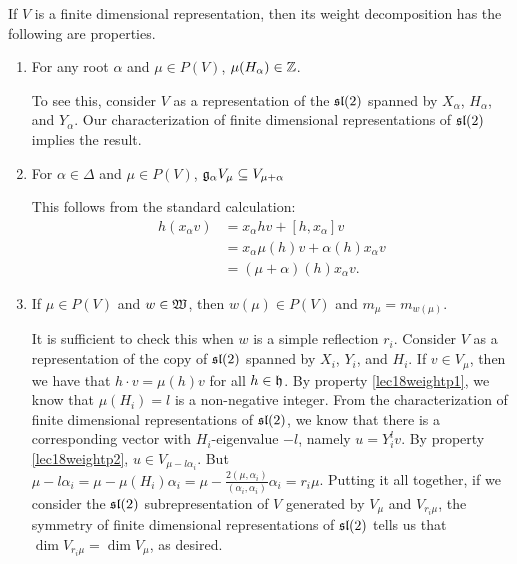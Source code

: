  If $V$ is a finite dimensional representation, then its weight decomposition has the
 following are properties.
 \begin{enumerate}
  \item \label{lec18weightp1} For any root $\alpha$ and $\mu\in P(V)$, $\mu(H_\alpha)\in \ZZ$.

    To see this, consider $V$ as a representation of the $\sl(2)$ spanned by
    $X_\alpha$, $H_\alpha$, and $Y_\alpha$. Our characterization of finite dimensional
    representations of $\sl(2)$ implies the result.

 \item \label{lec18weightp2} For $\alpha\in \Delta$ and $\mu\in P(V)$,  $\g_\alpha V_\mu\subseteq V_{\mu+\alpha}$

    This follows from the standard calculation:
    \begin{align*}
      h(x_\alpha v) &= x_\alpha hv + [h,x_\alpha]v\\
            &= x_\alpha \mu(h)v + \alpha(h) x_\alpha v\\
            &= (\mu+\alpha)(h)x_\alpha v.
    \end{align*}

   \item \label{lec18weightp3} If $\mu\in P(V)$ and $w\in \weyl$, then $w(\mu)\in P(V)$ and
   $m_\mu=m_{w(\mu)}$.

    It is sufficient to check this when $w$ is a simple reflection $r_i$. Consider $V$
    as a representation of the copy of $\sl(2)$ spanned by $X_i$, $Y_i$, and $H_i$. If
    $v\in V_\mu$, then we have that $h\cdot v = \mu(h) v$ for all $h\in \h$. By
    property \ref{lec18weightp1}, we know that $\mu(H_i)=l$ is a non-negative integer.
    From the characterization of finite dimensional representations of $\sl(2)$, we
    know that there is a corresponding vector with $H_i$-eigenvalue $-l$, namely $u =
    Y_i^l v$. By property \ref{lec18weightp2}, $u\in V_{\mu-l\alpha_i}$. But
    $\mu-l\alpha_i = \mu-\mu(H_i)\alpha_i = \mu -
    \frac{2(\mu,\alpha_i)}{(\alpha_i,\alpha_i)}\alpha_i = r_i\mu$. Putting it all
    together, if we consider the $\sl(2)$ subrepresentation of $V$ generated by
    $V_\mu$ and $V_{r_i\mu}$, the symmetry of finite dimensional representations of
    $\sl(2)$ tells us that $\dim V_{r_i\mu}=\dim V_\mu$, as desired.


\end{enumerate}
